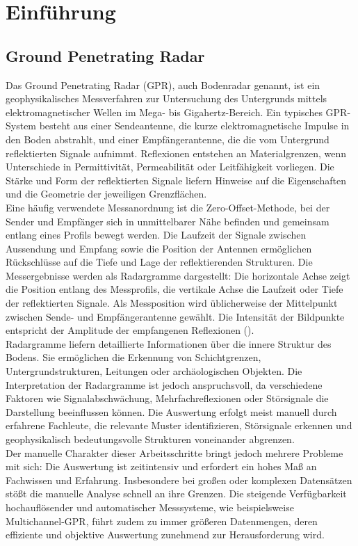 \section{Einführung}

\subsection{Ground Penetrating Radar}

Das Ground Penetrating Radar (GPR), auch Bodenradar genannt, ist ein geophysikalisches Messverfahren zur Untersuchung des Untergrunds mittels elektromagnetischer Wellen im Mega- bis Gigahertz-Bereich. Ein typisches GPR-System besteht aus einer Sendeantenne, die kurze elektromagnetische Impulse in den Boden abstrahlt, und einer Empfängerantenne, die die vom Untergrund reflektierten Signale aufnimmt. Reflexionen entstehen an Materialgrenzen, wenn Unterschiede in Permittivität, Permeabilität oder Leitfähigkeit vorliegen. Die Stärke und Form der reflektierten Signale liefern Hinweise auf die Eigenschaften und die Geometrie der jeweiligen Grenzflächen. \\
Eine häufig verwendete Messanordnung ist die Zero-Offset-Methode, bei der Sender und Empfänger sich in unmittelbarer Nähe befinden und gemeinsam entlang eines Profils bewegt werden. Die Laufzeit der Signale zwischen Aussendung und Empfang sowie die Position der Antennen ermöglichen Rückschlüsse auf die Tiefe und Lage der reflektierenden Strukturen. Die Messergebnisse werden als Radargramme dargestellt: Die horizontale Achse zeigt die Position entlang des Messprofils, die vertikale Achse die Laufzeit oder Tiefe der reflektierten Signale. Als Messposition wird üblicherweise der Mittelpunkt zwischen Sende- und Empfängerantenne gewählt. Die Intensität der Bildpunkte entspricht der Amplitude der empfangenen Reflexionen (\cite{annan_ground_2003}). \\
Radargramme liefern detaillierte Informationen über die innere Struktur des Bodens. Sie ermöglichen die Erkennung von Schichtgrenzen, Untergrundstrukturen, Leitungen oder archäologischen Objekten. Die Interpretation der Radargramme ist jedoch anspruchsvoll, da verschiedene Faktoren wie Signalabschwächung, Mehrfachreflexionen oder Störsignale die Darstellung beeinflussen können. Die Auswertung erfolgt meist manuell durch erfahrene Fachleute, die relevante Muster identifizieren, Störsignale erkennen und geophysikalisch bedeutungsvolle Strukturen voneinander abgrenzen. \\
Der manuelle Charakter dieser Arbeitsschritte bringt jedoch mehrere Probleme mit sich: Die Auswertung ist zeitintensiv und erfordert ein hohes Maß an Fachwissen und Erfahrung. Insbesondere bei großen oder komplexen Datensätzen stößt die manuelle Analyse schnell an ihre Grenzen. Die steigende Verfügbarkeit hochauflösender und automatischer Messsysteme, wie beispielsweise Multichannel-GPR, führt zudem zu immer größeren Datenmengen, deren effiziente und objektive Auswertung zunehmend zur Herausforderung wird.

